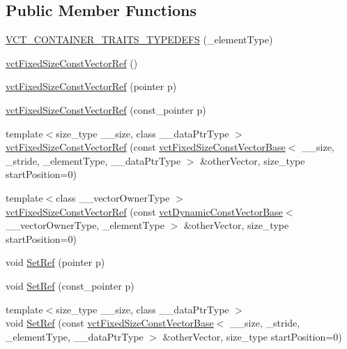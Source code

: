 \subsection*{Public Member Functions}
\begin{DoxyCompactItemize}
\item 
\hyperlink{classvct_fixed_size_const_vector_ref_a69d432ef7afc2c89ca4b4ed675a755cf}{V\+C\+T\+\_\+\+C\+O\+N\+T\+A\+I\+N\+E\+R\+\_\+\+T\+R\+A\+I\+T\+S\+\_\+\+T\+Y\+P\+E\+D\+E\+F\+S} (\+\_\+element\+Type)
\item 
\hyperlink{classvct_fixed_size_const_vector_ref_af19bbe8b3ffb90e3de7f5e127c7db4f7}{vct\+Fixed\+Size\+Const\+Vector\+Ref} ()
\item 
\hyperlink{classvct_fixed_size_const_vector_ref_a7828852fdd5436b0544367dfb5960f7d}{vct\+Fixed\+Size\+Const\+Vector\+Ref} (pointer p)
\item 
\hyperlink{classvct_fixed_size_const_vector_ref_a96326e204add5ab0d61fa65c556bf45c}{vct\+Fixed\+Size\+Const\+Vector\+Ref} (const\+\_\+pointer p)
\item 
{\footnotesize template$<$size\+\_\+type \+\_\+\+\_\+size, class \+\_\+\+\_\+data\+Ptr\+Type $>$ }\\\hyperlink{classvct_fixed_size_const_vector_ref_a3042a429feaf9f1381b14fe0f3c67962}{vct\+Fixed\+Size\+Const\+Vector\+Ref} (const \hyperlink{classvct_fixed_size_const_vector_base}{vct\+Fixed\+Size\+Const\+Vector\+Base}$<$ \+\_\+\+\_\+size, \+\_\+stride, \+\_\+element\+Type, \+\_\+\+\_\+data\+Ptr\+Type $>$ \&other\+Vector, size\+\_\+type start\+Position=0)
\item 
{\footnotesize template$<$class \+\_\+\+\_\+vector\+Owner\+Type $>$ }\\\hyperlink{classvct_fixed_size_const_vector_ref_a404ee3fb6c053895f3d42332268e5298}{vct\+Fixed\+Size\+Const\+Vector\+Ref} (const \hyperlink{classvct_dynamic_const_vector_base}{vct\+Dynamic\+Const\+Vector\+Base}$<$ \+\_\+\+\_\+vector\+Owner\+Type, \+\_\+element\+Type $>$ \&other\+Vector, size\+\_\+type start\+Position=0)
\item 
void \hyperlink{classvct_fixed_size_const_vector_ref_aba8d459ba9af7c3b473e9b557419e968}{Set\+Ref} (pointer p)
\item 
void \hyperlink{classvct_fixed_size_const_vector_ref_a18f517cba227bda39e184053cc384d34}{Set\+Ref} (const\+\_\+pointer p)
\item 
{\footnotesize template$<$size\+\_\+type \+\_\+\+\_\+size, class \+\_\+\+\_\+data\+Ptr\+Type $>$ }\\void \hyperlink{classvct_fixed_size_const_vector_ref_aa9a720a1cd38f40ed7f51e58cc5879d0}{Set\+Ref} (const \hyperlink{classvct_fixed_size_const_vector_base}{vct\+Fixed\+Size\+Const\+Vector\+Base}$<$ \+\_\+\+\_\+size, \+\_\+stride, \+\_\+element\+Type, \+\_\+\+\_\+data\+Ptr\+Type $>$ \&other\+Vector, size\+\_\+type start\+Position=0)

\end{DoxyCompactItemize}
